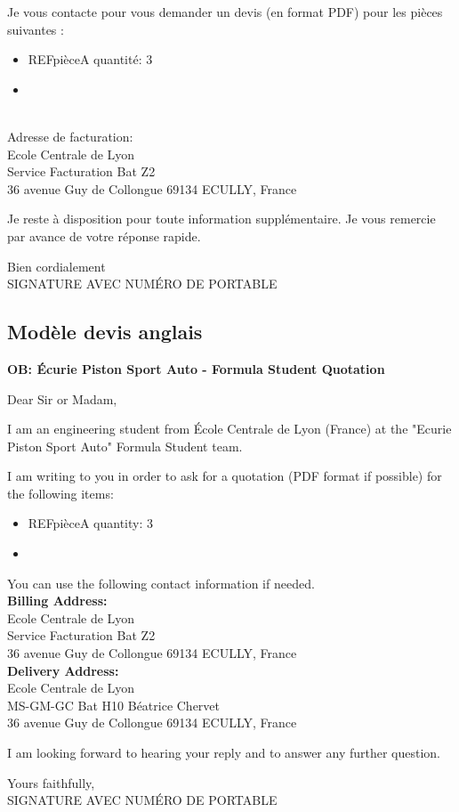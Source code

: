 \par Je vous contacte pour vous demander un devis (en format PDF) pour les pièces suivantes :
\begin{itemize}
	\item REFpièceA quantité: 3
	\item 
\end{itemize}




\\[1cm] Adresse de facturation:\\
Ecole Centrale de Lyon\\
Service Facturation Bat Z2\\
36 avenue Guy de Collongue 69134 ECULLY, France\\

\par Je reste à disposition pour toute information supplémentaire. Je vous remercie par avance de votre réponse rapide.


\par Bien cordialement\\
SIGNATURE AVEC NUMÉRO DE PORTABLE


\subsection{Modèle devis anglais}

\textbf{OB: Écurie Piston Sport Auto - Formula Student Quotation}

Dear Sir or Madam,\\

\par I am an engineering student from École Centrale de Lyon (France) at the "Ecurie Piston Sport
Auto" Formula Student team.
\par I am writing to you in order to ask for a quotation (PDF format if possible) for the following items:
\begin{itemize}
	\item REFpièceA quantity: 3
	\item 
\end{itemize}

\par You can use the following contact information if needed.\\
\textbf{Billing Address:}\\
Ecole Centrale de Lyon\\
Service Facturation Bat Z2\\
36 avenue Guy de Collongue 69134 ECULLY, France\\[.5cm]
\textbf{Delivery Address:}\\
Ecole Centrale de Lyon\\
MS-GM-GC Bat H10 Béatrice Chervet\\
36 avenue Guy de Collongue 69134 ECULLY, France\\
\par I am looking forward to hearing your reply and to answer any further question.
\par Yours faithfully,\\
SIGNATURE AVEC NUMÉRO DE PORTABLE